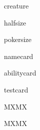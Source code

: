 \documentclass{article}
\begin{document}
\begin{tcard}{creature}%
\end{tcard}\vskip-1pt

\begin{tcard}{halfsize}%
\end{tcard}%

\clearpage

\begin{tcard}{pokersize}
\end{tcard}
\begin{tcard}{namecard}
\end{tcard}
\begin{tcard}{abilitycard}
\end{tcard}


\clearpage

\begin{tcard}{testcard}
\end{tcard}

\clearpage

\normalsize MXMX\setsymbolsizetofont\symbolbox\damagesymbol

\Large MXMX\setsymbolsizetofont\symbolbox\damagesymbol
\end{document}
